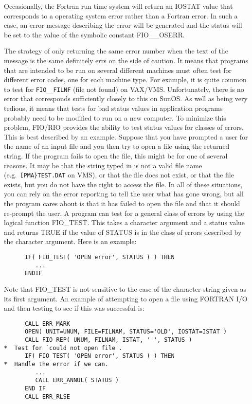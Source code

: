 Occasionally, the Fortran run time system will return an IOSTAT value that
corresponds to a operating system error rather than a Fortran error. In such a
case, an error message describing the error will be generated and the status
will be set to the value of the symbolic constant FIO\_\_OSERR.

The strategy of only returning the same error number when the text of the
message is the same definitely errs on the side of caution. It means that
programs that are intended to be run on several different machines must often
test for different error codes, one for each machine type. For example, it is
quite common to test for {\tt FIO\_\_FILNF} (file not found) on VAX/VMS.
Unfortunately, there is no error that corresponds sufficiently closely to this
on SunOS. As well as being very tedious, it means that tests for bad status
values in application programs probably need to be modified to run on a new
computer. To minimize this problem, FIO/RIO provides the ability to test status
values for classes of errors. This is best described by an example. Suppose
that you have prompted a user for the name of an input file and you then try to
open a file using the returned string. If the program fails to open the file,
this might be for one of several reasons. It may be that the string typed in is
not a valid file name (e.g.\ {\tt [PMA\}TEST.DAT} on VMS), or that the file
does not exist, or that the file exists, but you do not have the right to
access the file. In all of these situations, you can rely on the error
reporting to tell the user what has gone wrong, but all the program cares about
is that it has failed to open the file and that it should re-prompt the user. A
program can test for a general class of errors by using the logical function
FIO\_TEST. This takes a character argument and a status value and returns TRUE
if the value of STATUS is in the class of errors described by the character
argument.
Here is an example:

\begin{verbatim}
      IF( FIO_TEST( 'OPEN error', STATUS ) ) THEN
         ...
      ENDIF
\end{verbatim}

Note that FIO\_TEST is not sensitive to the case of the character string
given as its first argument. An example of attempting to open a file using
FORTRAN I/O and then testing to see if this was successful is:

\begin{verbatim}
      CALL ERR_MARK
      OPEN( UNIT=UNUM, FILE=FILNAM, STATUS='OLD', IOSTAT=ISTAT )
      CALL FIO_REP( UNUM, FILNAM, ISTAT, ' ', STATUS )
*  Test for `could not open file'.
      IF( FIO_TEST( 'OPEN error', STATUS ) ) THEN
*  Handle the error if we can.
         ...
         CALL ERR_ANNUL( STATUS )
      END IF
      CALL ERR_RLSE
\end{verbatim}


